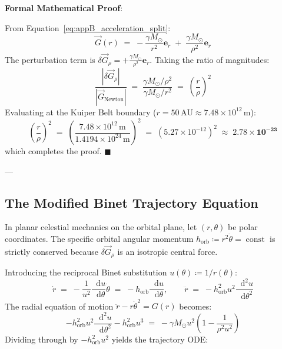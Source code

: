 \documentclass[
    12pt,
    a4paper,
    headings=normal,
    twoside=false,
    open=any,
    parskip=half
]{scrbook}
\newcommand{\diff}{\mathop{}\!\mathrm{d}}
\newenvironment{myproof}[1][]{%
  \par\vspace{6pt}\noindent\textbf{\sffamily\color{maincolor}Formal Mathematical Proof\ifstrempty{#1}{}{ (#1)}}:\par\nopagebreak
}{%
  \penalty50\hfill\ensuremath{\blacksquare}\par\vspace{6pt}
}
\begin{document}
\begin{myproof}
From Equation~\eqref{eq:appB_acceleration_split}:
\begin{equation*}
\vec{G}(r) \;=\; -\frac{\gamma M_\odot}{r^2}\mathbf{e}_r \;+\; \frac{\gamma M_\odot}{\rho^2}\mathbf{e}_r
\end{equation*}
The perturbation term is $\delta\vec{G}_\rho = +\frac{\gamma M_\odot}{\rho^2}\mathbf{e}_r$. Taking the ratio of magnitudes:
\begin{equation*}
\frac{|\delta\vec{G}_\rho|}{|\vec{G}_{\text{Newton}}|} \;=\; \frac{\gamma M_\odot / \rho^2}{\gamma M_\odot / r^2} \;=\; \left( \frac{r}{\rho} \right)^2
\end{equation*}
Evaluating at the Kuiper Belt boundary ($r = 50\,\text{AU} \approx 7.48 \times 10^{12}\,\text{m}$):
\begin{equation*}
\left( \frac{r}{\rho} \right)^2 \;=\; \left( \frac{7.48 \times 10^{12} \, \text{m}}{1.4194 \times 10^{24} \, \text{m}} \right)^2 \;=\; \left( 5.27 \times 10^{-12} \right)^2 \;\approx\; \mathbf{2.78 \times 10^{-23}}
\end{equation*}
which completes the proof.
\end{myproof}

---

\subsection{The Modified Binet Trajectory Equation}

In planar celestial mechanics on the orbital plane, let $(r, \theta)$ be polar coordinates. The specific orbital angular momentum $h_{\text{orb}} \coloneqq r^2 \dot{\theta} = \operatorname{const}$ is strictly conserved because $\delta\vec{G}_\rho$ is an isotropic central force.

Introducing the reciprocal Binet substitution $u(\theta) \coloneqq 1/r(\theta)$:
\begin{equation}
\dot{r} \;=\; -\frac{1}{u^2}\frac{\diff u}{\diff\theta}\dot{\theta} \;=\; -h_{\text{orb}}\frac{\diff u}{\diff\theta}, \qquad \ddot{r} \;=\; -h_{\text{orb}}^2 u^2 \frac{\diff^2 u}{\diff\theta^2}
\end{equation}
The radial equation of motion $\ddot{r} - r\dot{\theta}^2 = G(r)$ becomes:
\begin{equation}
-h_{\text{orb}}^2 u^2 \frac{\diff^2 u}{\diff\theta^2} - h_{\text{orb}}^2 u^3 \;=\; -\gamma M_\odot u^2 \left( 1 - \frac{1}{\rho^2 u^2} \right)
\end{equation}
Dividing through by $-h_{\text{orb}}^2 u^2$ yields the trajectory ODE:
\end{document}
